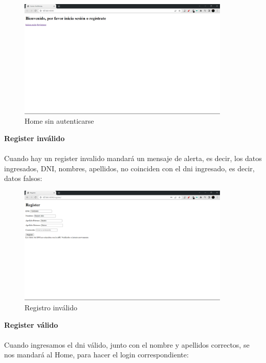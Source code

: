 \documentclass{article}
\begin{document}
     \begin{figure}[H]
            \centering
            \includegraphics[width=0.9\textwidth,keepaspectratio]{img/dni/homeBasico.png}
            \caption{Home sin autenticarse}
            \label{fig:enter-label}
        \end{figure}

     \textbf{Register inválido}\\\\
     Cuando hay un register invalido mandará un mensaje de alerta, es decir, los datos ingresados, DNI, nombres, apellidos, no coinciden con el dni ingresado, es decir, datos falsos:
     
     \begin{figure}[H]
            \centering
            \includegraphics[width=0.9\textwidth,keepaspectratio]{img/dni/registerInvalid.png}
            \caption{Registro inválido}
            \label{fig:enter-label}
        \end{figure}

     \textbf{Register válido}\\\\
        Cuando ingresamos el dni válido, junto con el nombre y apellidos correctos, se nos mandará al Home, para hacer el login correspondiente:
     
\end{document}
